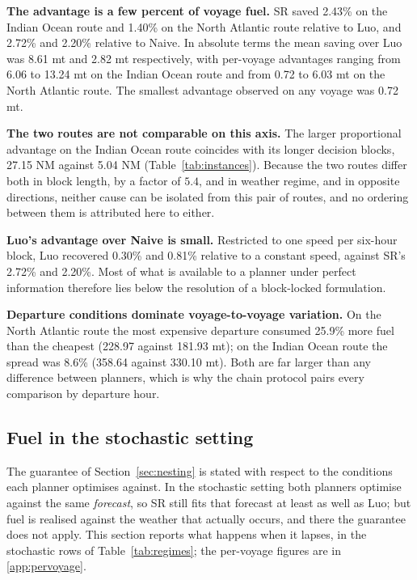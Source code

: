 \documentclass[review,authoryear]{elsarticle}
\begin{document}
\noindent\textbf{The advantage is a few percent of voyage fuel.} SR saved 2.43\% on the Indian Ocean
route and 1.40\% on the North Atlantic route relative to Luo, and 2.72\% and 2.20\% relative to
Naive. In absolute terms the mean saving over Luo was 8.61 mt and 2.82 mt respectively, with
per-voyage advantages ranging from 6.06 to 13.24 mt on the Indian Ocean route and from 0.72 to
6.03 mt on the North Atlantic route. The smallest advantage observed on any voyage was 0.72 mt.

\noindent\textbf{The two routes are not comparable on this axis.} The larger proportional advantage
on the Indian Ocean route coincides with its longer decision blocks, 27.15 NM against 5.04 NM
(Table~\ref{tab:instances}). Because the two routes differ both in block length, by a factor of
$5.4$, and in weather regime, and in opposite directions, neither cause can be isolated from this
pair of routes, and no ordering between them is attributed here to either.

\noindent\textbf{Luo's advantage over Naive is small.} Restricted to one speed per six-hour block,
Luo recovered 0.30\% and 0.81\% relative to a constant speed, against SR's 2.72\% and 2.20\%. Most of
what is available to a planner under perfect information therefore lies below the resolution of a
block-locked formulation.

\noindent\textbf{Departure conditions dominate voyage-to-voyage variation.} On the North Atlantic
route the most expensive departure consumed 25.9\% more fuel than the cheapest (228.97 against
181.93 mt); on the Indian Ocean route the spread was 8.6\% (358.64 against 330.10 mt). Both are far
larger than any difference between planners, which is why the chain protocol pairs every comparison
by departure hour.

\subsection{Fuel in the stochastic setting}
\label{sec:res-stoch}
The guarantee of Section~\ref{sec:nesting} is stated with respect to the conditions each planner
optimises against. In the stochastic setting both planners optimise against the same \emph{forecast},
so SR still fits that forecast at least as well as Luo; but fuel is realised against the weather that
actually occurs, and there the guarantee does not apply. This section reports what happens when it
lapses, in the stochastic rows of Table~\ref{tab:regimes}; the per-voyage figures are in
\ref{app:pervoyage}.
\end{document}
